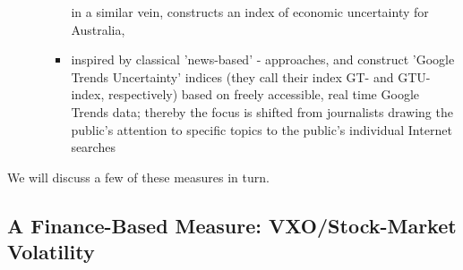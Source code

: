 \documentclass[a4paper,11pt,listof=nochaptergap,oneside,pointednumbers,bibtotoc,bigheadings,liststotoc]{scrbook}
\begin{document}
\begin{itemize}
\begin{itemize}
\begin{itemize}
			in a similar vein, \citet{moore:17} constructs an index of economic uncertainty for Australia,
				\item inspired by classical 'news-based' - approaches, \citet{bontempietal:16} and \citet{castelnuovoandtran:17} construct 'Google Trends Uncertainty' indices (they call their index GT- and GTU-index, respectively) based on freely accessible, real time Google Trends data; thereby the focus is shifted from journalists drawing the public's attention to specific topics to the public's individual Internet searches
			\end{itemize}
		\end{itemize}
\end{itemize} 

We will discuss a few of these measures in turn.


\subsection{A Finance-Based Measure: VXO/Stock-Market Volatility}
\label{sec:bloomshock}
\end{document}
